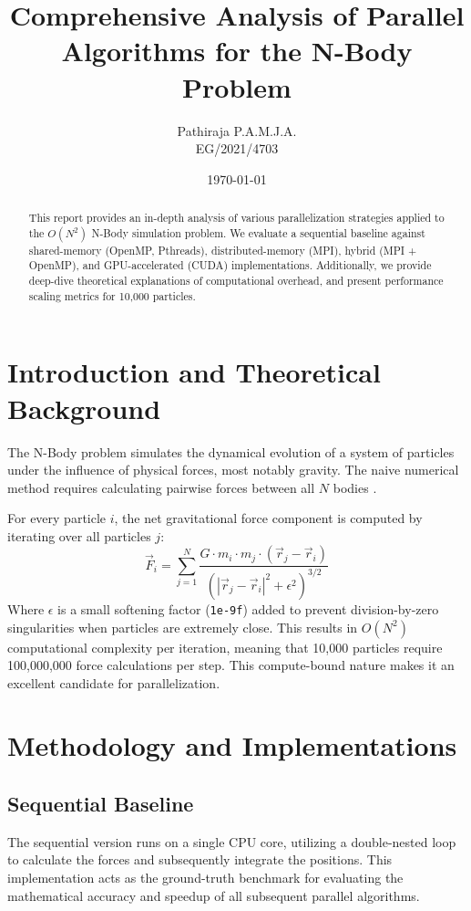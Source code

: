\documentclass[12pt,a4paper,titlepage]{article}
\title{Comprehensive Analysis of Parallel Algorithms for the N-Body Problem}
\author{Pathiraja P.A.M.J.A. \\ EG/2021/4703}
\date{\today}
\begin{document}
\maketitle

\begin{abstract}
This report provides an in-depth analysis of various parallelization strategies applied to the $O(N^2)$ N-Body simulation problem. We evaluate a sequential baseline against shared-memory (OpenMP, Pthreads), distributed-memory (MPI), hybrid (MPI + OpenMP), and GPU-accelerated (CUDA) implementations. Additionally, we provide deep-dive theoretical explanations of computational overhead, and present performance scaling metrics for 10,000 particles.
\end{abstract}

\tableofcontents
\newpage

\section{Introduction and Theoretical Background}
The N-Body problem simulates the dynamical evolution of a system of particles under the influence of physical forces, most notably gravity. The naive numerical method requires calculating pairwise forces between all $N$ bodies \cite{nbody}.

For every particle $i$, the net gravitational force component is computed by iterating over all particles $j$:
\begin{equation}
\vec{F}_i = \sum_{j=1}^{N} \frac{G \cdot m_i \cdot m_j \cdot (\vec{r}_j - \vec{r}_i)}{(|\vec{r}_j - \vec{r}_i|^2 + \epsilon^2)^{3/2}}
\end{equation}
Where $\epsilon$ is a small softening factor (\texttt{1e-9f}) added to prevent division-by-zero singularities when particles are extremely close. This results in $O(N^2)$ computational complexity per iteration, meaning that 10,000 particles require 100,000,000 force calculations per step. This compute-bound nature makes it an excellent candidate for parallelization.

\newpage
\section{Methodology and Implementations}

\subsection{Sequential Baseline}
The sequential version runs on a single CPU core, utilizing a double-nested loop to calculate the forces and subsequently integrate the positions. This implementation acts as the ground-truth benchmark for evaluating the mathematical accuracy and speedup of all subsequent parallel algorithms.
\end{document}
